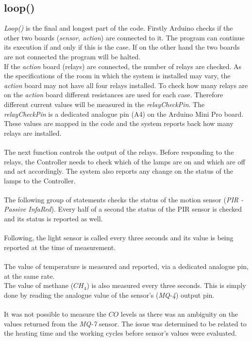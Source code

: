 \documentclass[12pt,a4paper]{report}
\begin{document}
\subsection{loop()}
\textit{Loop()} is the final and longest part of the code.
Firstly Arduino checks if the other two boards (\textit{sensor, action}) are connected to it.
The program can continue its execution if and only if this is the case.
If on the other hand the two boards are not connected the program will be halted.
\ \\
If the \textit{action} board (relays) are connected, the number of relays are checked.
As the specifications of the room in which the system is installed may vary, the \textit{action} board may not have all four relays installed.
To check how many relays are on the \textit{action} board different resistances are used for each case.
Therefore different current values will be measured in the \textit{relayCheckPin}. 
The \textit{relayCheckPin} is a dedicated analogue pin (A4) on the Arduino Mini Pro board. %
These values are mapped in the code and the system reports back how many relays are installed.\\
\ \\
The next function controls the output of the relays.
Before responding to the relays, the Controller needs to check which of the lamps are on and which are off and act accordingly.
The system also reports any change on the status of the lamps to the Controller. \\
\ \\
The following group of statements checks the status of the motion sensor (\textit{PIR - Passive InfaRed}).
Every half of a second the status of the PIR sensor is checked and its status is reported as well.\\
\ \\
Following, the light sensor is called every three seconds and its value is being reported at the time of measurement.\\
\ \\
The value of temperature is measured and reported, via a dedicated analogue pin, at the same rate.
\ \\
The value of methane ($CH_4$) is also measured every three seconds.
This is simply done by reading the analogue value of the sensor's (\textit{MQ-4}) output pin.\\
\ \\
It was not possible to measure the $CO$ levels as there was an ambiguity on the values returned from the \textit{MQ-7} sensor.
The issue was determined to be related to the heating time and the working cycles before sensor's values were evaluated.\\
\ \\
%
\end{document}
